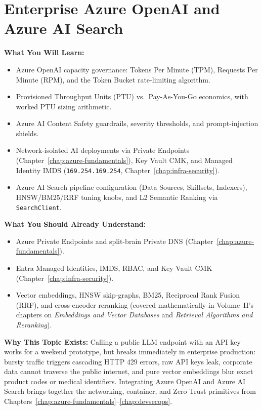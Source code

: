 \chapter{Enterprise Azure OpenAI and Azure AI Search}
\label{chap:azure-ai}

\begin{chaptergoalsbox}
\textbf{What You Will Learn:}
\begin{itemize}[leftmargin=12pt]
  \item Azure OpenAI capacity governance: Tokens Per Minute (TPM), Requests Per Minute (RPM), and the Token Bucket rate-limiting algorithm.
  \item Provisioned Throughput Units (PTU) vs.\ Pay-As-You-Go economics, with worked PTU sizing arithmetic.
  \item Azure AI Content Safety guardrails, severity thresholds, and prompt-injection shields.
  \item Network-isolated AI deployments via Private Endpoints (Chapter~\ref{chap:azure-fundamentals}), Key Vault CMK, and Managed Identity IMDS (\texttt{169.254.169.254}, Chapter~\ref{chap:infra-security}).
  \item Azure AI Search pipeline configuration (Data Sources, Skillsets, Indexers), HNSW/BM25/RRF tuning knobs, and L2 Semantic Ranking via \texttt{SearchClient}.
\end{itemize}

\textbf{What You Should Already Understand:}
\begin{itemize}[leftmargin=12pt]
  \item Azure Private Endpoints and split-brain Private DNS (Chapter~\ref{chap:azure-fundamentals}).
  \item Entra Managed Identities, IMDS, RBAC, and Key Vault CMK (Chapter~\ref{chap:infra-security}).
  \item Vector embeddings, HNSW skip-graphs, BM25, Reciprocal Rank Fusion (RRF), and cross-encoder reranking (covered mathematically in Volume~II's chapters on \emph{Embeddings and Vector Databases} and \emph{Retrieval Algorithms and Reranking}).
\end{itemize}

\textbf{Why This Topic Exists:}
Calling a public LLM endpoint with an API key works for a weekend prototype, but breaks immediately in enterprise production: bursty traffic triggers cascading HTTP 429 errors, raw API keys leak, corporate data cannot traverse the public internet, and pure vector embeddings blur exact product codes or medical identifiers. Integrating Azure OpenAI and Azure AI Search brings together the networking, container, and Zero Trust primitives from Chapters~\ref{chap:azure-fundamentals}--\ref{chap:devsecops}.


\end{chaptergoalsbox}
